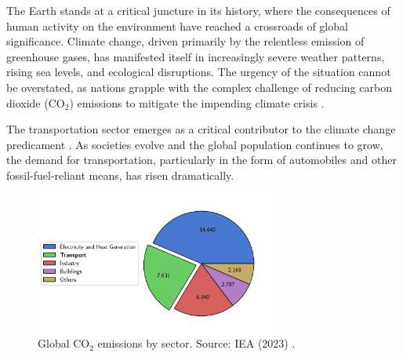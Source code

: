 
The Earth stands at a critical juncture in its history, where the consequences of human activity on the environment have reached a crossroads of global significance. Climate change, driven primarily by the relentless emission of greenhouse gases, has manifested itself in increasingly severe weather patterns, rising sea levels, and ecological disruptions. The urgency of the situation cannot be overstated, as nations grapple with the complex challenge of reducing carbon dioxide (CO$_2$) emissions to mitigate the impending climate crisis \cite{solomon2009irreversible}. 

The transportation sector emerges as a critical contributor to the climate change predicament \cite{iea-transport}. As societies evolve and the global population continues to grow, the demand for transportation, particularly in the form of automobiles and other fossil-fuel-reliant means, has risen dramatically. 

\begin{figure}[h]
    \centering
    \includegraphics[width=0.7\textwidth]{Images/Chapter1/iea-transport.png}
    \caption{Global CO$_2$ emissions by sector. Source: IEA (2023) \cite{iea-transport}.}
    \label{fig:iea-transport}
\end{figure}





